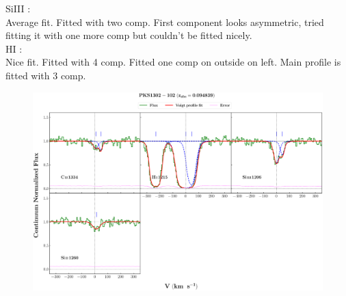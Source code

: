 \documentclass[12pt]{report}
\begin{document}
SiIII :  \\  \hspace*{1.5cm}
        Average fit. Fitted with two comp.  First component looks asymmetric, tried fitting it with one more comp but couldn't be fitted nicely. \\

HI :  \\  \hspace*{1.5cm}
        Nice fit. Fitted with 4 comp. Fitted one comp on outside on left. Main profile is fitted with 3 comp.  \\



\newpage

\begin{landscape}

\begin{figure}
    \centering
    \vspace{-20mm}
    \hspace*{-35mm}
    \includegraphics[width=1.25\linewidth]{System-Plots/PKS1302-102_z=0.094839_sys_plot.png}
\end{figure}

\end{landscape}
\end{document}
